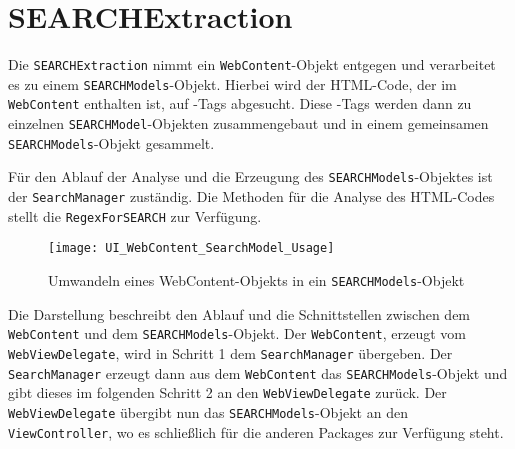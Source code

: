 
\section{SEARCHExtraction}
Die \lstinline|SEARCHExtraction| nimmt ein \lstinline|WebContent|-Objekt entgegen und verarbeitet es zu einem \lstinline|SEARCHModels|-Objekt. Hierbei wird der HTML-Code, der im \lstinline|WebContent| enthalten ist, auf \SEARCH-Tags abgesucht. Diese \SEARCH-Tags werden dann zu einzelnen \lstinline|SEARCHModel|-Objekten zusammengebaut und in einem gemeinsamen \lstinline|SEARCHModels|-Objekt gesammelt.

Für den Ablauf der Analyse und die Erzeugung des \lstinline|SEARCHModels|-Objektes ist der \lstinline|SearchManager| zuständig. Die Methoden für die Analyse des HTML-Codes stellt die \lstinline|RegexForSEARCH| zur Verfügung.

\begin{figure}[h]
	\centering
	\texttt{[image: UI\_WebContent\_SearchModel\_Usage]}
	\caption{Umwandeln eines WebContent-Objekts in ein \lstinline|SEARCHModels|-Objekt}
\end{figure}

Die Darstellung beschreibt den Ablauf und die Schnittstellen zwischen dem \lstinline|WebContent| und dem \lstinline|SEARCHModels|-Objekt. Der \lstinline|WebContent|, erzeugt vom \lstinline|WebViewDelegate|, wird in Schritt 1 dem \lstinline|SearchManager| übergeben. Der \lstinline|SearchManager| erzeugt dann aus dem \lstinline|WebContent| das \lstinline|SEARCHModels|-Objekt und gibt dieses im folgenden Schritt 2 an den \lstinline|WebViewDelegate| zurück. Der \lstinline|WebViewDelegate| übergibt nun das \lstinline|SEARCHModels|-Objekt an den \lstinline|ViewController|, wo es schließlich für die anderen Packages zur Verfügung  steht.